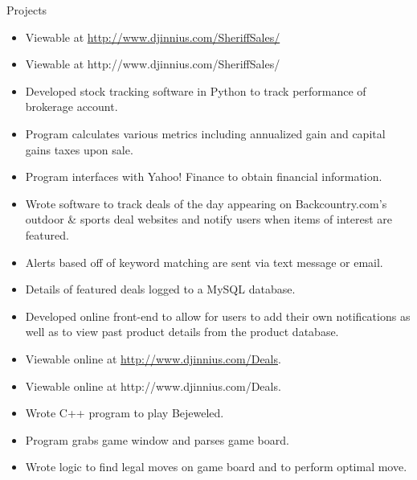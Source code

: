 \begin{category}{Projects}
\begin{itemize}
\ifDjinniusLinks
\ifWebLinks
\item Viewable at \href{ http://www.djinnius.com/SheriffSales/ }{ http://www.djinnius.com/SheriffSales/}
\else
\item Viewable at  http://www.djinnius.com/SheriffSales/
\fi
\fi

\end{itemize}

\begin{itemize}
\item Developed stock tracking software in Python to track performance of brokerage account.
\item Program calculates various metrics including annualized gain and capital gains taxes upon sale.
\item Program interfaces with Yahoo! Finance to obtain financial information.
\end{itemize}



\begin{itemize}
\item Wrote software to track deals of the day appearing on Backcountry.com's outdoor \& sports deal websites and notify users when items of interest are featured.
\item Alerts based off of keyword matching are sent via text message or email.
\item Details of featured deals logged to a MySQL database. 
\item Developed online front-end to allow for users to add their own notifications as well as to view past product details from the product database.
\ifDjinniusLinks
\ifWebLinks
\item Viewable online at \href{ http://www.djinnius.com/Deals/ }{http://www.djinnius.com/Deals}.
\else
\item Viewable online at http://www.djinnius.com/Deals.
\fi
\fi
\end{itemize}

\begin{itemize}
\item Wrote C++ program to play Bejeweled.
\item Program grabs game window and parses game board.
\item Wrote logic to find legal moves on game board and to perform optimal move.
\end{itemize}



\end{category}
